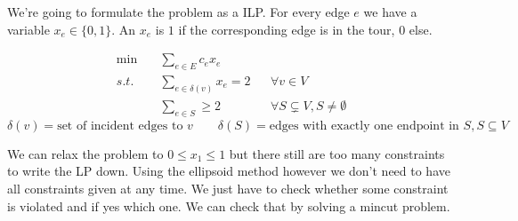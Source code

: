 \begin{Ex} We're going to formulate the problem as a ILP. For every edge $e$ we have a variable $x_e\in \{0,1\}$. An $x_e$ is $1$ if the corresponding edge is in the tour, $0$ else.

\begin{align*}
\min \quad & \sum_{e\in E} c_e x_e\\
s.t. & \sum_{e\in \delta(v)} x_e = 2 && \forall v\in V\\
	& \sum_{e\in S} \geq 2 && \forall S\subsetneq V, S\neq \emptyset
\end{align*}
\[\delta(v) = \text{set of incident edges to $v$} \qquad \delta(S) = \text{edges with exactly one endpoint in $S$}, S\subseteq V\]

We can relax the problem to $0\leq x_1 \leq 1$ but there still are too many constraints to write the LP down. Using the ellipsoid method however we don't need to have all constraints given at any time. We just have to check whether some constraint is violated and if yes which one. We can check that by solving a mincut problem.
\end{Ex}